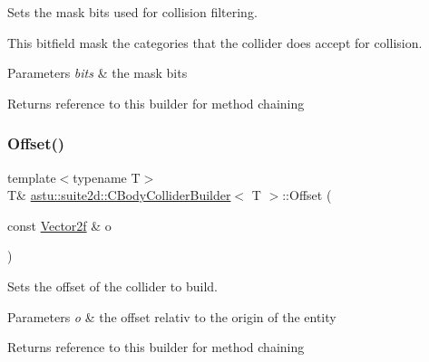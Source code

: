 Sets the mask bits used for collision filtering.

This bitfield mask the categories that the collider does accept for collision.


\begin{DoxyParams}{Parameters}
{\em bits} & the mask bits \\
\hline
\end{DoxyParams}
\begin{DoxyReturn}{Returns}
reference to this builder for method chaining 
\end{DoxyReturn}
\mbox{\label{classastu_1_1suite2d_1_1CBodyColliderBuilder_a2fb80e617b4125b355f2e207e9335640}} 
\subsubsection{\texorpdfstring{Offset()}{Offset()}}
{\footnotesize\ttfamily template$<$typename T$>$ \\
T\& \hyperlink{classastu_1_1suite2d_1_1CBodyColliderBuilder}{astu\+::suite2d\+::\+C\+Body\+Collider\+Builder}$<$ T $>$\+::Offset (\begin{DoxyParamCaption}\item[{const \hyperlink{classastu_1_1Vector2}{Vector2f} \&}]{o }\end{DoxyParamCaption})\hspace{0.3cm}{\ttfamily [inline]}}

Sets the offset of the collider to build.


\begin{DoxyParams}{Parameters}
{\em o} & the offset relativ to the origin of the entity \\
\hline
\end{DoxyParams}
\begin{DoxyReturn}{Returns}
reference to this builder for method chaining 
\end{DoxyReturn}
\mbox{\label{classastu_1_1suite2d_1_1CBodyColliderBuilder_ae56a7af01fd76c06336d812884b1789a}} 

